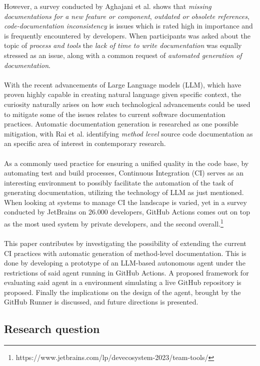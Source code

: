 However, a survey conducted by Aghajani et al.\cite{aghajani2020software} shows that \textit{missing documentations for a new feature or component}, \textit{outdated or obsolete references}, \textit{code-documentation inconsistency} is issues which is rated high in importance and is frequently encountered by developers. When participants was asked about the topic of \textit{process and tools} the \textit{lack of time to write documentation} was equally stressed as an issue, along with a common request of \textit{automated generation of documentation}.
\\ \\
With the recent advancements of Large Language models (LLM), which have proven highly capable in creating natural language given specific context, the curiosity naturally arises on how such technological advancements could be used to mitigate some of the issues relates to current software documentation practices. Automatic documentation generation is researched as one possible mitigation, with Rai et al. identifying \textit{method level} source code documentation as an specific area of interest in contemporary research\cite{rai2022review}.
\\ \\
As a commonly used practice for ensuring a unified quality in the code base, by automating test and build processes, Continuous Integration (CI) serves as an interesting environment to possibly facilitate the automation of the task of generating documentation, utilizing the technology of LLM as just mentioned.
When looking at systems to manage CI the landscape is varied, yet in a survey conducted by JetBrains on 26.000 developers, GitHub Actions comes out on top as the most used system by private developers, and the second overall.\footnote{https://www.jetbrains.com/lp/devecosystem-2023/team-tools/}
\\ \\
This paper contributes by investigating the possibility of extending the current CI practices with automatic generation of method-level documentation. This is done by developing a prototype of an LLM-based autonomous agent under the restrictions of said agent running in GitHub Actions. A proposed framework for evaluating said agent in a environment simulating a live GitHub repository is proposed. Finally the implications on the design of the agent, brought by the GitHub Runner is discussed, and future directions is presented.

\subsection{Research question}
\researchQuestion